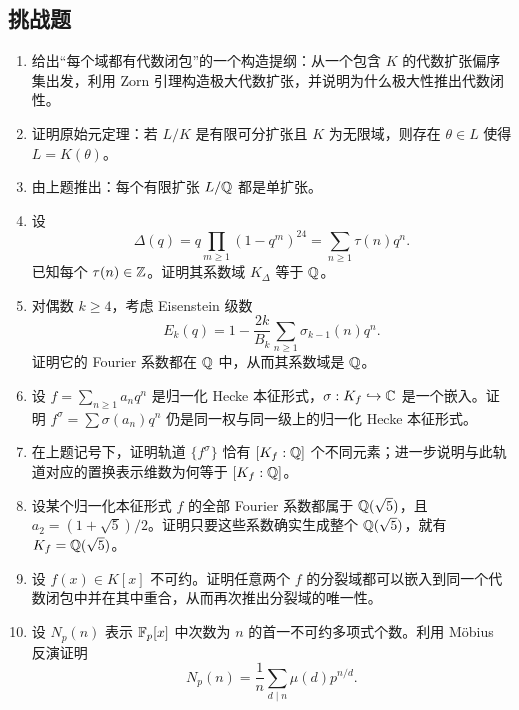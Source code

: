 \subsection*{挑战题}

\begin{enumerate}[label=\arabic*., leftmargin=2.5em, resume]
\item \textbf{\hard} 给出“每个域都有代数闭包”的一个构造提纲：从一个包含 $K$ 的代数扩张偏序集出发，利用 Zorn 引理构造极大代数扩张，并说明为什么极大性推出代数闭性。
\item \textbf{\hard} 证明原始元定理：若 $L/K$ 是有限可分扩张且 $K$ 为无限域，则存在 $\theta\in L$ 使得 $L=K(\theta)$。
\item \textbf{\hard} 由上题推出：每个有限扩张 $L/\mathbb{Q}$ 都是单扩张。
\item \textbf{\hard} 设
\[
\Delta(q)=q\prod_{m\ge1}(1-q^m)^{24}=\sum_{n\ge1}\tau(n)q^n.
\]
已知每个 $\tau(n)\in\mathbb{Z}$。证明其系数域 $K_\Delta$ 等于 $\mathbb{Q}$。
\item \textbf{\hard} 对偶数 $k\ge4$，考虑 Eisenstein 级数
\[
E_k(q)=1-\frac{2k}{B_k}\sum_{n\ge1}\sigma_{k-1}(n)q^n.
\]
证明它的 Fourier 系数都在 $\mathbb{Q}$ 中，从而其系数域是 $\mathbb{Q}$。
\item \textbf{\hard} 设 $f=\sum_{n\ge1}a_n q^n$ 是归一化 Hecke 本征形式，$\sigma:K_f\hookrightarrow\mathbb{C}$ 是一个嵌入。证明 $f^\sigma=\sum \sigma(a_n)q^n$ 仍是同一权与同一级上的归一化 Hecke 本征形式。
\item \textbf{\hard} 在上题记号下，证明轨道 $\{f^\sigma\}$ 恰有 $[K_f:\mathbb{Q}]$ 个不同元素；进一步说明与此轨道对应的置换表示维数为何等于 $[K_f:\mathbb{Q}]$。
\item \textbf{\hard} 设某个归一化本征形式 $f$ 的全部 Fourier 系数都属于 $\mathbb{Q}(\sqrt5)$，且 $a_2=(1+\sqrt5)/2$。证明只要这些系数确实生成整个 $\mathbb{Q}(\sqrt5)$，就有 $K_f=\mathbb{Q}(\sqrt5)$。
\item \textbf{\hard} 设 $f(x)\in K[x]$ 不可约。证明任意两个 $f$ 的分裂域都可以嵌入到同一个代数闭包中并在其中重合，从而再次推出分裂域的唯一性。
\item \textbf{\hard} 设 $N_p(n)$ 表示 $\mathbb{F}_p[x]$ 中次数为 $n$ 的首一不可约多项式个数。利用 Möbius 反演证明
\[
N_p(n)=\frac1n\sum_{d\mid n}\mu(d)p^{n/d}.
\]
\end{enumerate}

